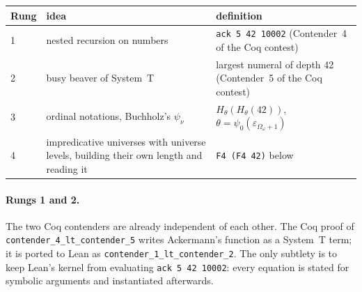 \documentclass[11pt]{article}
\theoremstyle{definition}
\theoremstyle{remark}
\newcommand{\lean}[1]{\texttt{#1}}
\begin{document}
\begin{center}
\begin{tabular}{l p{} p{}}
\toprule
Rung & idea & definition\\
\midrule
1 & nested recursion on numbers & \lean{ack 5 42 10002} (Contender~4 of the Coq contest)\\
2 & busy beaver of System~T & largest numeral of depth 42 (Contender~5 of the Coq contest)\\
3 & ordinal notations, Buchholz's $\psi_\nu$ & $H_\theta(H_\theta(42))$, $\theta=\psi_0(\varepsilon_{\Omega_\omega+1})$\\
4 & impredicative universes with universe levels, building their own length and reading it & \lean{F4 (F4 42)} below\\
\bottomrule
\end{tabular}
\end{center}

\paragraph{Rungs 1 and 2.} The two Coq contenders are already independent of
each other. The Coq proof of \lean{contender\_4\_lt\_contender\_5} writes
Ackermann's function as a System~T term; it is ported to Lean as
\lean{contender\_1\_lt\_contender\_2}. The only subtlety is to keep Lean's
kernel from evaluating \lean{ack 5 42 10002}: every equation is stated for
symbolic arguments and instantiated afterwards.
\end{document}
